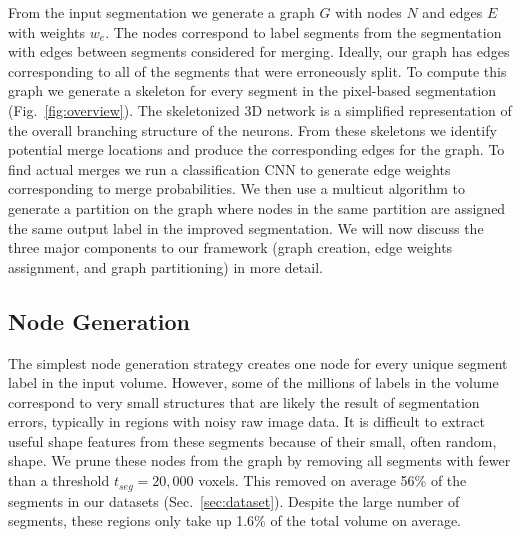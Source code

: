 From the input segmentation we generate a graph $G$ with nodes $N$ and edges $E$ with weights $w_e$. The nodes correspond to label segments from the segmentation with edges between segments considered for merging. Ideally, our graph has edges corresponding to all of the segments that were erroneously split. To compute this graph we generate a skeleton for every segment in the pixel-based segmentation (Fig.~\ref{fig:overview}). The skeletonized 3D network is a simplified representation of the overall branching structure of the neurons. From these skeletons we identify potential merge locations and produce the corresponding edges for the graph. To find actual merges we run a classification CNN to generate edge weights corresponding to merge probabilities. We then use a multicut algorithm to generate a partition on the graph where nodes in the same partition are assigned the same output label in the improved segmentation. We will now discuss the three major components to our framework (graph creation, edge weights assignment, and graph partitioning) in more detail.



\subsection{Node Generation}
\label{sec:skeletonization}

The simplest node generation strategy creates one node for every unique segment label in the input volume. However, some of the millions of labels in the volume correspond to very small structures that are likely the result of segmentation errors, typically in regions with noisy raw image data. It is difficult to extract useful shape features from these segments because of their small, often random, shape. We prune these nodes from the graph by removing all segments with fewer than a threshold $t_{seg} = 20,000$ voxels. This removed on average 56\% of the segments in our  datasets (Sec.~\ref{sec:dataset}). Despite the large number of segments, these regions only take up 1.6\% of the total volume on average.

